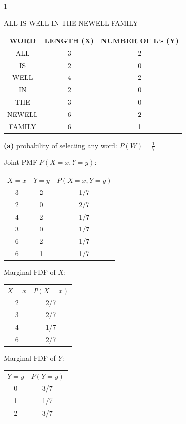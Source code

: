 \documentclass[12 pt]{article}
\begin{document}
    \begin{exercise}{1}
    \hfill

    ALL IS WELL IN THE NEWELL FAMILY

    \hfill

    \begin{tabular}{c|c|c}
         \textbf{WORD} & \textbf{LENGTH (X)} & \textbf{NUMBER OF L's (Y)} \\
          ALL & 3 & 2 \\
          IS & 2 & 0 \\
          WELL & 4 & 2 \\
          IN & 2 & 0 \\
          THE & 3 & 0 \\
          NEWELL & 6 & 2 \\
          FAMILY & 6 & 1 \\      
    \end{tabular}

    \hfill

    \textbf{(a)} probability of selecting any word: $P(W) = \frac{1}{7}$

    \hfill

    Joint PMF $P(X=x,Y=y)$:

    \begin{tabular}{c|c|c}
        \textbf{$X=x$} & \textbf{$Y=y$} & \textbf{$P(X=x,Y=y)$} \\
         3 & 2 & 1/7 \\
         2 & 0 & 2/7 \\
         4 & 2 & 1/7 \\
         3 & 0 & 1/7 \\
         6 & 2 & 1/7 \\
         6 & 1 & 1/7
    \end{tabular}

    \hfill

    Marginal PDF of $X$:
    
    \begin{tabular}{c|c}
        \textbf{$X=x$} & \textbf{$P(X=x)$} \\
         2 & 2/7 \\
         3 & 2/7 \\
         4 & 1/7 \\
         6 & 2/7
    \end{tabular}

    \hfill

    Marginal PDF of $Y$:

    \begin{tabular}{c|c}
        $Y=y$ & $P(Y=y)$ \\
        0 & 3/7 \\
        1 & 1/7 \\
        2 & 3/7
    \end{tabular}


\end{exercise}
\end{document}
